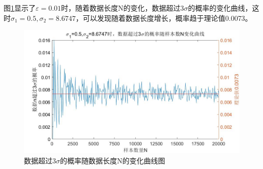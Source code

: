 \documentclass[fontset=windows]{article}
\numberwithin{figure}{section}
\begin{document}
图\ref*{fig:5}显示了\(\varepsilon=0.01\)时，随着数据长度N的变化，数据超过\(3\sigma\)的概率的变化曲线，这时\(\sigma_1=0.5,\sigma_2=8.6747\)，可以发现随着数据长度增长，概率趋于理论值0.0073。

\begin{figure}[H]
	\centering
	\includegraphics[scale=0.4]{3.jpg}
	\caption{数据超过\(3\sigma\)的概率随数据长度N的变化曲线图}
	\label{fig:5}
\end{figure}


\end{document}
